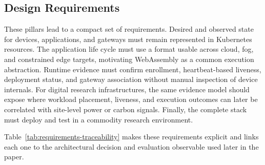 \subsection{Design Requirements}
These pillars lead to a compact set of requirements. Desired and observed state for devices, applications, and gateways must remain represented in Kubernetes resources. %
 The application life cycle must use a format usable across cloud, fog, and constrained edge targets, motivating WebAssembly as a common execution abstraction. Runtime evidence must confirm enrollment, heartbeat-based liveness, deployment status, and gateway association without manual inspection of device internals. For digital research infrastructures, the same evidence model should expose where workload placement, liveness, and execution outcomes can later be correlated with site-level power or carbon signals. Finally, the complete stack must deploy and test in a commodity research environment.

\begingroup
\color{red}
Table~\ref{tab:requirements-traceability} makes these requirements explicit and links each one to the architectural decision and evaluation observable used later in the paper. 

